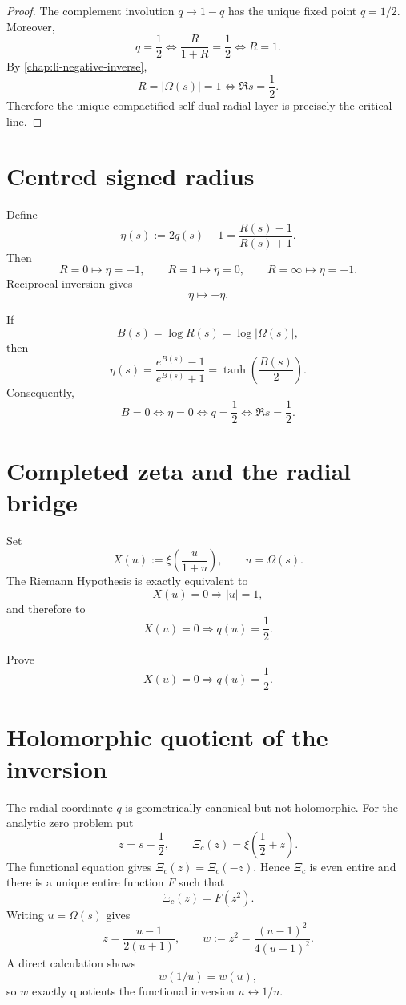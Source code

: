 \begin{proof}
The complement involution $q\mapsto1-q$ has the unique fixed point $q=1/2$. Moreover,
\[
q=\frac12
\iff
\frac{R}{1+R}=\frac12
\iff
R=1.
\]
By \cref{chap:li-negative-inverse},
\[
R=|\Omega(s)|=1
\iff
\Re s=\frac12.
\]
Therefore the unique compactified self-dual radial layer is precisely the critical line.
\end{proof}

\section{Centred signed radius}

Define
\[
\boxed{
\eta(s):=2q(s)-1=\frac{R(s)-1}{R(s)+1}
}.
\]
Then
\[
R=0\mapsto\eta=-1,
\qquad
R=1\mapsto\eta=0,
\qquad
R=\infty\mapsto\eta=+1.
\]
Reciprocal inversion gives
\[
\boxed{\eta\mapsto-\eta}.
\]

If
\[
B(s)=\log R(s)=\log|\Omega(s)|,
\]
then
\[
\eta(s)
=\frac{e^{B(s)}-1}{e^{B(s)}+1}
=\boxed{\tanh\!\left(\frac{B(s)}{2}\right)}.
\]
Consequently,
\[
\boxed{
B=0
\iff
\eta=0
\iff
q=\frac12
\iff
\Re s=\frac12.
}
\]

\section{Completed zeta and the radial bridge}

Set
\[
X(u):=\xi\!\left(\frac{u}{1+u}\right),
\qquad u=\Omega(s).
\]
The Riemann Hypothesis is exactly equivalent to
\[
X(u)=0\Longrightarrow |u|=1,
\]
and therefore to
\[
\boxed{X(u)=0\Longrightarrow q(u)=\frac12.}
\]

\begin{problem}
Prove
\[
X(u)=0\Longrightarrow q(u)=\frac12.
\]
\end{problem}

\section{Holomorphic quotient of the inversion}

The radial coordinate $q$ is geometrically canonical but not holomorphic. For the analytic zero problem put
\[
z=s-\frac12,
\qquad
\Xi_c(z)=\xi\!\left(\frac12+z\right).
\]
The functional equation gives $\Xi_c(z)=\Xi_c(-z)$. Hence $\Xi_c$ is even entire and there is a unique entire function $F$ such that
\[
\boxed{\Xi_c(z)=F(z^2).}
\]
Writing $u=\Omega(s)$ gives
\[
z=\frac{u-1}{2(u+1)},
\qquad
\boxed{w:=z^2=\frac{(u-1)^2}{4(u+1)^2}.}
\]
A direct calculation shows
\[
w(1/u)=w(u),
\]
so $w$ exactly quotients the functional inversion $u\leftrightarrow1/u$.

